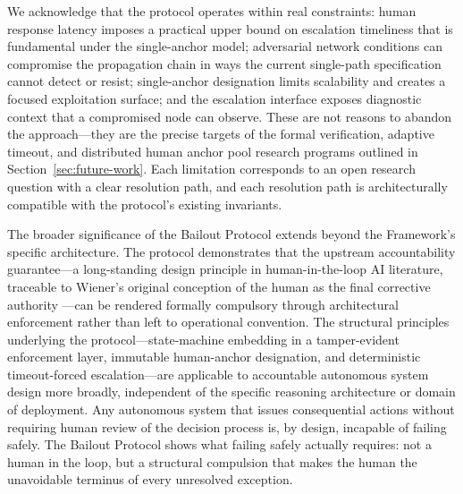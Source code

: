 We acknowledge that the protocol operates within real constraints: human response latency imposes a practical upper bound on escalation timeliness that is fundamental under the single-anchor model; adversarial network conditions can compromise the propagation chain in ways the current single-path specification cannot detect or resist; single-anchor designation limits scalability and creates a focused exploitation surface; and the escalation interface exposes diagnostic context that a compromised node can observe. These are not reasons to abandon the approach---they are the precise targets of the formal verification, adaptive timeout, and distributed human anchor pool research programs outlined in Section~\ref{sec:future-work}. Each limitation corresponds to an open research question with a clear resolution path, and each resolution path is architecturally compatible with the protocol's existing invariants.

The broader significance of the Bailout Protocol extends beyond the \bxthree{} Framework's specific architecture. The protocol demonstrates that the upstream accountability guarantee---a long-standing design principle in human-in-the-loop AI literature, traceable to Wiener's original conception of the human as the final corrective authority \cite{wiener1954human}---can be rendered formally compulsory through architectural enforcement rather than left to operational convention. The structural principles underlying the protocol---state-machine embedding in a tamper-evident enforcement layer, immutable human-anchor designation, and deterministic timeout-forced escalation---are applicable to accountable autonomous system design more broadly, independent of the specific reasoning architecture or domain of deployment. Any autonomous system that issues consequential actions without requiring human review of the decision process is, by design, incapable of failing safely. The Bailout Protocol shows what failing safely actually requires: not a human in the loop, but a structural compulsion that makes the human the unavoidable terminus of every unresolved exception.
